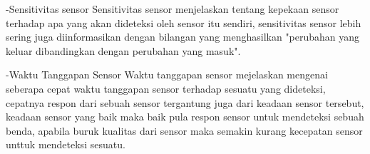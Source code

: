 -Sensitivitas sensor
Sensitivitas sensor menjelaskan tentang kepekaan sensor terhadap apa yang akan dideteksi oleh sensor itu sendiri,
sensitivitas sensor lebih sering juga diinformasikan dengan bilangan yang menghasilkan "perubahan yang keluar dibandingkan dengan perubahan yang masuk". 

-Waktu Tanggapan Sensor
Waktu tanggapan sensor mejelaskan mengenai seberapa cepat waktu tanggapan sensor terhadap sesuatu yang dideteksi,
cepatnya respon dari sebuah sensor tergantung juga dari keadaan sensor tersebut, keadaan sensor yang baik maka baik pula respon sensor untuk mendeteksi sebuah benda, apabila buruk kualitas dari sensor maka semakin kurang kecepatan sensor unttuk mendeteksi sesuatu.